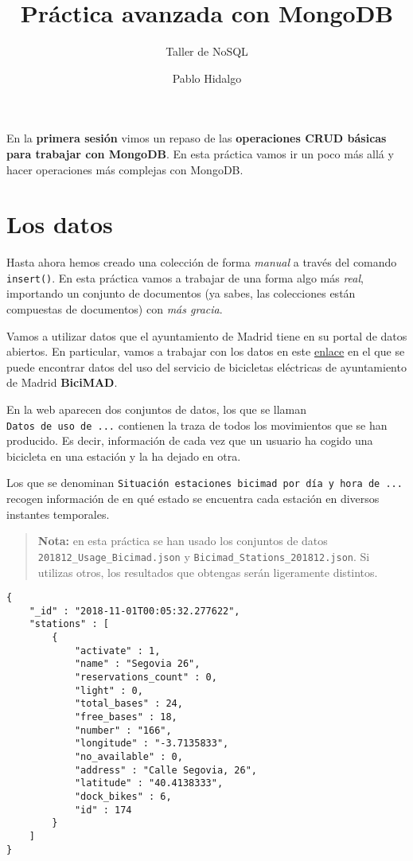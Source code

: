 \documentclass[]{article}
\title{Práctica avanzada con MongoDB}
\subtitle{Taller de NoSQL}
\author{Pablo Hidalgo}
\date{}
\begin{document}
\maketitle

{
\setcounter{tocdepth}{2}
\tableofcontents
}
En la \textbf{primera sesión} vimos un repaso de las \textbf{operaciones
CRUD básicas para trabajar con MongoDB}. En esta práctica vamos ir un
poco más allá y hacer operaciones más complejas con MongoDB.

\hypertarget{los-datos}{%
\section{Los datos}\label{los-datos}}

Hasta ahora hemos creado una colección de forma \emph{manual} a través
del comando \texttt{insert()}. En esta práctica vamos a trabajar de una
forma algo más \emph{real}, importando un conjunto de documentos (ya
sabes, las colecciones están compuestas de documentos) con \emph{más
gracia}.

Vamos a utilizar datos que el ayuntamiento de Madrid tiene en su portal
de datos abiertos. En particular, vamos a trabajar con los datos en este
\href{https://opendata.emtmadrid.es/Datos-estaticos/Datos-generales-(1)}{enlace}
en el que se puede encontrar datos del uso del servicio de bicicletas
eléctricas de ayuntamiento de Madrid \textbf{BiciMAD}.

En la web aparecen dos conjuntos de datos, los que se llaman
\texttt{Datos\ de\ uso\ de\ ...} contienen la traza de todos los
movimientos que se han producido. Es decir, información de cada vez que
un usuario ha cogido una bicicleta en una estación y la ha dejado en
otra.

Los que se denominan
\texttt{Situación\ estaciones\ bicimad\ por\ día\ y\ hora\ de\ ...}
recogen información de en qué estado se encuentra cada estación en
diversos instantes temporales.

\begin{quote}
\textbf{Nota:} en esta práctica se han usado los conjuntos de datos
\texttt{201812\_Usage\_Bicimad.json} y
\texttt{Bicimad\_Stations\_201812.json}. Si utilizas otros, los
resultados que obtengas serán ligeramente distintos.
\end{quote}

\begin{verbatim}
{
    "_id" : "2018-11-01T00:05:32.277622",
    "stations" : [
        {
            "activate" : 1,
            "name" : "Segovia 26",
            "reservations_count" : 0,
            "light" : 0,
            "total_bases" : 24,
            "free_bases" : 18,
            "number" : "166",
            "longitude" : "-3.7135833",
            "no_available" : 0,
            "address" : "Calle Segovia, 26",
            "latitude" : "40.4138333",
            "dock_bikes" : 6,
            "id" : 174
        }
    ]
}
\end{verbatim}
\end{document}
